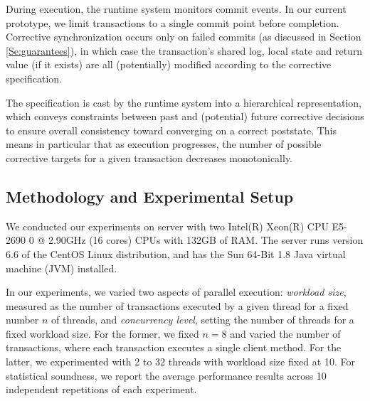 During execution, the runtime system monitors commit events. In our current prototype, we limit transactions to a single commit point before completion. Corrective synchronization occurs only on failed commits (as discussed in Section \ref{Se:guarantees}), in which case the transaction's shared log, local state and return value (if it exists) are all (potentially) modified according to the corrective specification. 

The specification is cast by the runtime system into a hierarchical representation, which conveys constraints between past and (potential) future corrective decisions to ensure overall consistency toward converging on a correct poststate. This means in particular that as execution progresses, the number of possible corrective targets for a given transaction decreases monotonically.

\subsection{Methodology and Experimental Setup}

We conducted our experiments on server with two Intel(R) Xeon(R) CPU E5-2690 0 @ 2.90GHz (16 cores) CPUs with 132GB of RAM. The server runs version
6.6 of the CentOS Linux distribution, and has the Sun 64-Bit 1.8 Java virtual machine (JVM) installed.

In our experiments, we varied two aspects of parallel execution: \emph{workload size}, measured as the number of transactions executed by a given thread for a fixed number $n$ of threads, and \emph{concurrency level}, setting the number of threads for a fixed workload size. For the former, we fixed $n=8$ and varied the number of transactions, where each transaction executes a single client method. For the latter, we experimented with 2 to 32 threads with workload size fixed at 10.
For statistical soundness, we report the average performance results across 10 independent repetitions of each experiment.

